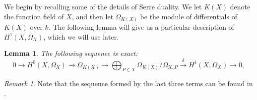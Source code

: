 \documentclass[draft, 11pt]{article} %
\theoremstyle{plain}
\newtheorem{lem}[defn]{Lemma}
\theoremstyle{remark}
\newtheorem*{rem}{Remark}
\newcommand{\ra}{\rightarrow}
\newcommand{\hzero}{{H^0(X,\Omega_X)}}
\begin{document}
We begin by recalling some of the details of Serre duality.
We let $K(X)$ denote the function field of $X$, and then let $\Omega_{K(X)}$ be the module of differentials of $K(X)$ over $k$.
The following lemma will give us a particular description of $H^1(X,\Omega_X)$, which we will use later.
\begin{lem}\label{exactsequencelemma}
The following sequence is exact:
\begin{equation}\label{dualityses}
0 \rightarrow \hzero \ra \Omega_{K(X)} \ra \bigoplus_{P \in X}\Omega_{K(X)}/\Omega_{X,P} \xrightarrow{\delta} H^1(X,\Omega_X) \ra 0,
\end{equation}
\end{lem}
\begin{rem}
Note that the sequence formed by the last three terms can be found in \cite[Pg. 248]{hart}.
\end{rem}
\end{document}
